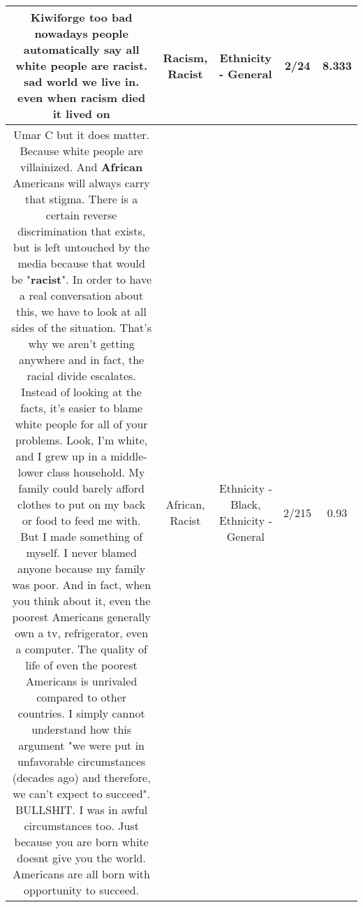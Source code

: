 \documentclass[11pt]{article}
\newlength\mylength
\begin{document}
\begin{center}
\begin{longtable}{|C{.65\mylength}|C{.30\mylength}|C{.12\mylength}|C{.12\mylength}|C{.12\mylength}|}
  \small Kiwiforge too bad nowadays people automatically say all white people are \textbf{racist}. sad world we live in. even when \textbf{racism} died it lived on\normalsize   & Racism, Racist & Ethnicity - General & 2/24 & 8.333 \\  \hline
  \small Umar C but it does matter. Because white people are villainized. And \textbf{African} Americans will always carry that stigma. There is a certain reverse discrimination that exists, but is left untouched by the media because that would be "\textbf{racist}". In order to have a real conversation about this, we have to look at all sides of the situation. That's why we aren't getting anywhere and in fact, the racial divide escalates. Instead of looking at the facts, it's easier to blame white people for all of your problems. Look, I'm white, and I grew up in a middle-lower class household. My family could barely afford clothes to put on my back or food to feed me with. But I made something of myself. I never blamed anyone because my family was poor. And in fact, when you think about it, even the poorest Americans generally own a tv, refrigerator, even a computer. The quality of life of even the poorest Americans is unrivaled compared to other countries. I simply cannot understand how this argument "we were put in unfavorable circumstances (decades ago) and therefore, we can't expect to succeed". BULLSHIT. I was in awful circumstances too. Just because you are born white doesnt give you the world. Americans are all born with opportunity to succeed.\normalsize   & African, Racist & Ethnicity - Black, Ethnicity - General & 2/215 & 0.93 \\  \hline

\end{longtable}
\end{center}
\end{document}
